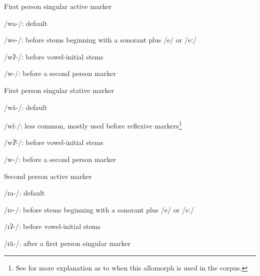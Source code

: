 \begin{exe}
    \item\label{CHSkEx1A} First person singular active marker

    \begin{xlist}
        \item\label{CHSkEx1Aa} {/wa-/}: default
        \item\label{CHSkEx1Ab} {/we-/}: before stems beginning with a sonorant plus /e/ or /eː/
        \item\label{CHSkEx1Ac} {/wʔ-/}: before vowel-initial stems
        \item\label{CHSkEx1Ad} {/w-/}: before a second person marker
    \end{xlist}

    \item\label{CHSkEx1S} First person singular stative marker

    \begin{xlist}
        \item\label{CHSkEx1Sa} {/wã-/}: default
        \item\label{CHSkEx1Sb} {/wĩ-/}: less common, mostly used before reflexive markers\footnote{See  for more explanation as to when this allomorph is used in the corpus.}
        \item\label{CHSkEx1Sc} {/wʔ\~-/}: before vowel-initial stems
        \item\label{CHSkEx1Sd} {/w-/}: before a second person marker
    \end{xlist}

    \item\label{CHSkEx2A} Second person active marker

    \begin{xlist}
        \item\label{CHSkEx2Aa} /ɾa-/: default
        \item\label{CHSkEx2Ab} /ɾe-/: before stems beginning with a sonorant plus /e/ or /eː/
        \item\label{CHSkEx2Ac} /ɾʔ-/: before vowel-initial stems
        \item\label{CHSkEx2Sd} /ɾã-/: after a first person singular marker

    \end{xlist}


\end{exe}
